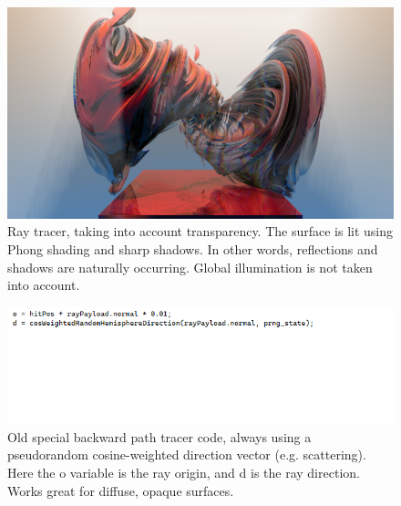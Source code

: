 \documentclass[12pt]{article}
\begin{document}
\begin{figure} 
\centering
  \includegraphics[width = 6 in]{fig2.png}
  \caption{ Ray tracer, taking into account transparency.
The surface is lit using Phong shading and sharp shadows.
In other words, reflections and shadows are naturally occurring.
Global illumination is not taken into account.
}
\end{figure}




\begin{figure} 
\centering
  \includegraphics[width = 6 in]{fig3.png}
  \caption{ Old special backward path tracer code, always using a pseudorandom cosine-weighted direction vector (e.g. scattering).
Here the o variable is the ray origin, and d is the ray direction.
Works great for diffuse, opaque surfaces.
}
\end{figure}
\end{document}
